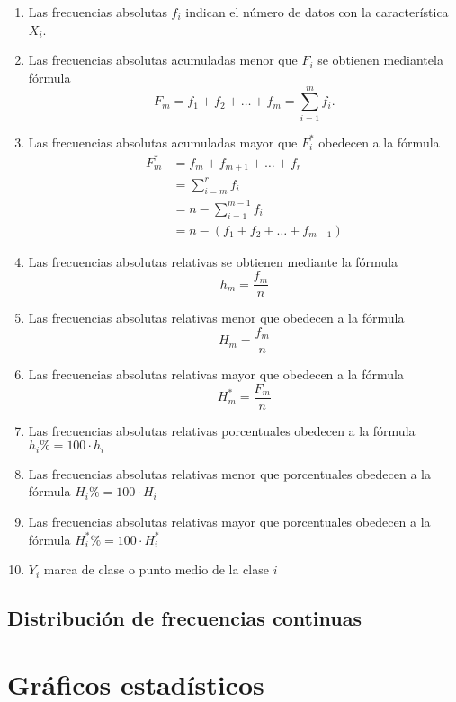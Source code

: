 \documentclass[a4paper]{report}
\begin{document}
\begin{enumerate}
	\item  Las frecuencias absolutas $f_i$ indican el número de datos con la característica $X_i$.
	\item  Las frecuencias absolutas acumuladas menor que $F_i$ se obtienen mediantela fórmula $$F_m=f_1+f_2+\ldots+f_m=\sum_{i=1}^mf_i.$$ 
	\item   Las frecuencias absolutas acumuladas mayor que $F_i^*$ obedecen a la fórmula
	      $$
		      \begin{aligned}
			      F_m^* & =f_m+f_{m+1}+\ldots+f_r                  \\
			            & =\sum_{i=m}^rf_i                         \\
			            & =n-\sum_{i=1}^{m-1}f_i                   \\
			            & =n-\left(f_1+f_{2}+\ldots+f_{m-1}\right)
		      \end{aligned}
	      $$
	\item  Las frecuencias absolutas relativas se obtienen mediante la fórmula $$h_m=\frac{f_m}{n}$$
	\item  Las frecuencias absolutas relativas menor que obedecen a la fórmula $$H_m=\frac{f_m}{n}$$
	\item  Las frecuencias absolutas relativas mayor que obedecen a la fórmula $$H_m^*=\frac{F_m}{n}$$
	\item  Las frecuencias absolutas relativas porcentuales obedecen a la fórmula $h_i\%=100\cdot h_i$
	\item  Las frecuencias absolutas relativas menor que porcentuales obedecen a la fórmula $H_i\%=100\cdot H_i$
	\item  Las frecuencias absolutas relativas mayor que porcentuales obedecen a la fórmula $H_i^*\%=100\cdot H_i^*$
	\item  $Y_i$ marca de clase o punto medio de la clase $i$
\end{enumerate}


\subsection{Distribución de frecuencias continuas}


\section{Gráficos estadísticos}
\end{document}

